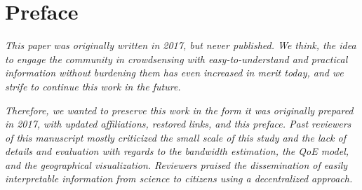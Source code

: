 \section*{Preface}


\textit{This paper was originally written in 2017, but never published. We think, the idea to engage the community in crowdsensing with easy-to-understand and practical information without burdening them has even increased in merit today, and we strife to continue this work in the future.} 

\textit{Therefore, we wanted to preserve this work in the form it was originally prepared in 2017, with updated affiliations, restored links, and this preface. Past reviewers of this manuscript mostly criticized the small scale of this study and the lack of details and evaluation with regards to the bandwidth estimation, the QoE model, and the geographical visualization. Reviewers praised the dissemination of easily interpretable information from science to citizens using a decentralized approach.}